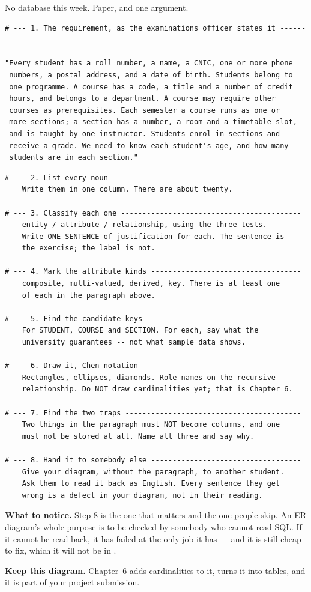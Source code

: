 \begin{lab}
No database this week. Paper, and one argument.

\begin{lstlisting}
# --- 1. The requirement, as the examinations officer states it -------

"Every student has a roll number, a name, a CNIC, one or more phone
 numbers, a postal address, and a date of birth. Students belong to
 one programme. A course has a code, a title and a number of credit
 hours, and belongs to a department. A course may require other
 courses as prerequisites. Each semester a course runs as one or
 more sections; a section has a number, a room and a timetable slot,
 and is taught by one instructor. Students enrol in sections and
 receive a grade. We need to know each student's age, and how many
 students are in each section."
\end{lstlisting}

\begin{lstlisting}
# --- 2. List every noun --------------------------------------------
    Write them in one column. There are about twenty.

# --- 3. Classify each one ------------------------------------------
    entity / attribute / relationship, using the three tests.
    Write ONE SENTENCE of justification for each. The sentence is
    the exercise; the label is not.

# --- 4. Mark the attribute kinds -----------------------------------
    composite, multi-valued, derived, key. There is at least one
    of each in the paragraph above.

# --- 5. Find the candidate keys ------------------------------------
    For STUDENT, COURSE and SECTION. For each, say what the
    university guarantees -- not what sample data shows.

# --- 6. Draw it, Chen notation -------------------------------------
    Rectangles, ellipses, diamonds. Role names on the recursive
    relationship. Do NOT draw cardinalities yet; that is Chapter 6.

# --- 7. Find the two traps -----------------------------------------
    Two things in the paragraph must NOT become columns, and one
    must not be stored at all. Name all three and say why.

# --- 8. Hand it to somebody else -----------------------------------
    Give your diagram, without the paragraph, to another student.
    Ask them to read it back as English. Every sentence they get
    wrong is a defect in your diagram, not in their reading.
\end{lstlisting}

\smallskip
\textbf{What to notice.} Step 8 is the one that matters and the one people
skip. An ER diagram's whole purpose is to be checked by somebody who cannot
read SQL. If it cannot be read back, it has failed at the only job it has ---
and it is still cheap to fix, which it will not be in .

\smallskip
\textbf{Keep this diagram.} Chapter~6 adds cardinalities to it, 
turns it into tables, and it is part of your project submission.
\end{lab}


